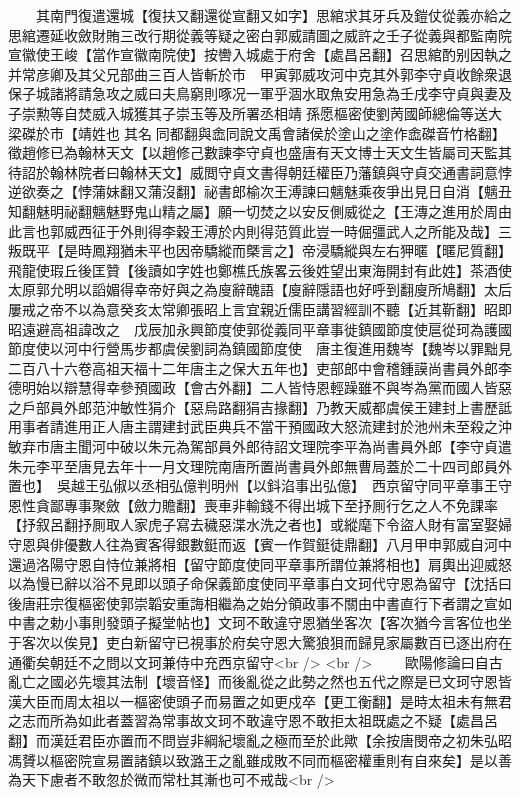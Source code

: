 　　其南門復遣還城【復扶又翻還從宣翻又如字】思綰求其牙兵及鎧仗從義亦給之思綰遷延收斂財賄三改行期從義等疑之密白郭威請圖之威許之壬子從義與都監南院宣徽使王峻【當作宣徽南院使】按轡入城處于府舍【處昌呂翻】召思綰酌别因執之并常彦卿及其父兄部曲三百人皆斬於市　甲寅郭威攻河中克其外郭李守貞收餘衆退保子城諸將請急攻之威曰夫鳥窮則啄况一軍乎涸水取魚安用急為壬戌李守貞與妻及子崇勲等自焚威入城獲其子崇玉等及所署丞相靖孫愿樞密使劉苪國師總倫等送大梁磔於市【靖姓也其名同都翻與嵞同說文禹會諸侯於塗山之塗作嵞磔音竹格翻】徵趙修已為翰林天文【以趙修己數諫李守貞也盛唐有天文博士天文生皆屬司天監其待詔於翰林院者曰翰林天文】威閲守貞文書得朝廷權臣乃藩鎮與守貞交通書詞意悖逆欲奏之【悖蒲妹翻又蒲沒翻】祕書郎榆次王溥諫曰魑魅乘夜爭出見日自消【魑丑知翻魅明祕翻魑魅野鬼山精之屬】願一切焚之以安反側威從之【王漙之進用於周由此言也郭威西征于外則得李穀王溥於内則得范質此豈一時倔彊武人之所能及哉】三叛既平【是時鳳翔猶未平也因帝驕縱而槩言之】帝浸驕縱與左右狎暱【暱尼質翻】飛龍使瑕丘後匡贊【後讀如字姓也鄭樵氏族畧云後姓望出東海開封有此姓】茶酒使太原郭允明以謟媚得幸帝好與之為廋辭醜語【廋辭隱語也好呼到翻廋所鳩翻】太后屢戒之帝不以為意癸亥太常卿張昭上言宜親近儒臣講習經訓不聽【近其靳翻】昭即昭遠避高祖諱改之　戊辰加永興節度使郭從義同平章事徙鎮國節度使扈從珂為護國節度使以河中行營馬步都虞侯劉詞為鎮國節度使　唐主復進用魏岑【魏岑以罪黜見二百八十六卷高祖天福十二年唐主之保大五年也】吏部郎中會稽鍾謨尚書員外郎李德明始以辯慧得幸參預國政【會古外翻】二人皆恃恩輕躁雖不與岑為黨而國人皆惡之戶部員外郎范沖敏性狷介【惡烏路翻狷吉掾翻】乃教天威都虞侯王建封上書歷詆用事者請進用正人唐主謂建封武臣典兵不當干預國政大怒流建封於池州未至殺之沖敏弃市唐主聞河中破以朱元為駕部員外郎待詔文理院李平為尚書員外郎【李守貞遣朱元李平至唐見去年十一月文理院南唐所置尚書員外郎無曹局蓋於二十四司郎員外置也】　吳越王弘俶以丞相弘億判明州【以鈄淊事出弘億】　西京留守同平章事王守恩性貪鄙專事聚斂【斂力贍翻】喪車非輸錢不得出城下至抒厠行乞之人不免課率【抒叙呂翻抒厠取人家虎子寫去穢惡渫水洗之者也】或縱麾下令盜人財有富室娶婦守恩與俳優數人往為賓客得銀數鋌而返【賓一作賀鋌徒鼎翻】八月甲申郭威自河中還過洛陽守恩自恃位兼將相【留守節度使同平章事所謂位兼將相也】肩輿出迎威怒以為慢已辭以浴不見即以頭子命保義節度使同平章事白文珂代守恩為留守【沈括曰後唐莊宗復樞密使郭崇韜安重誨相繼為之始分領政事不關由中書直行下者謂之宣如中書之勅小事則發頭子擬堂帖也】文珂不敢違守恩猶坐客次【客次猶今言客位也坐于客次以俟見】吏白新留守已視事於府矣守恩大驚狼狽而歸見家屬數百已逐出府在通衢矣朝廷不之問以文珂兼侍中充西京留守<br />
<br />
　　歐陽修論曰自古亂亡之國必先壞其法制【壞音怪】而後亂從之此勢之然也五代之際是已文珂守恩皆漢大臣而周太祖以一樞密使頭子而易置之如更戍卒【更工衡翻】是時太祖未有無君之志而所為如此者蓋習為常事故文珂不敢違守恩不敢拒太祖既處之不疑【處昌呂翻】而漢廷君臣亦置而不問豈非綱紀壞亂之極而至於此歟【余按唐閔帝之初朱弘昭馮贇以樞密院宣易置諸鎮以致潞王之亂雖成敗不同而樞密權重則有自來矣】是以善為天下慮者不敢忽於微而常杜其漸也可不戒哉<br />
